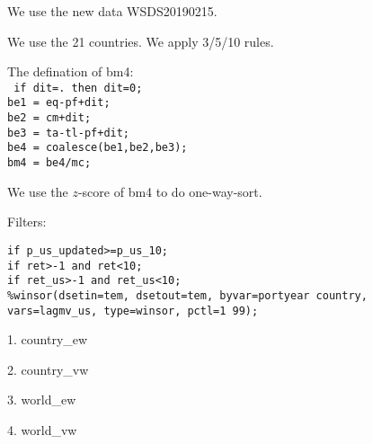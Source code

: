 % 

\usepackage[T1]{fontenc}




\thispagestyle{fancy}

\newcommand{\code}{\texttt}
\newcommand*{\Commonpath}{20190227/bm-nnnDS}


We use the new data WSDS20190215.

We use the 21  countries.
We apply 3/5/10 rules.

The defination of bm4:\\
\code{
if dit=. then dit=0;\\
be1 = eq-pf+dit;\\
be2 = cm+dit;\\
be3 = ta-tl-pf+dit;\\
be4 = coalesce(be1,be2,be3);\\
bm4 = be4/mc;\\
}

We use the $z$-score of bm4 to do one-way-sort.


Filters:

\code{if p\_us\_updated>=p\_us\_10;} \\
\code{if ret>-1 and ret<10;} \\
\code{if ret\_us>-1 and ret\_us<10;} \\
\code{\%winsor(dsetin=tem, dsetout=tem, byvar=portyear country, vars=lagmv\_us, type=winsor, pctl=1 99);}

\small


1. country\_ew


2. country\_vw



3. world\_ew


4. world\_vw






